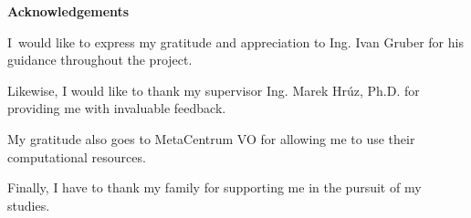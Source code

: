\vspace*{20pt}
\noindent
{\LARGE
\textbf{Acknowledgements}
}
\vspace*{0.5em}

I would like to express my gratitude and appreciation to Ing. Ivan Gruber for his guidance throughout the project.

Likewise, I would like to thank my supervisor Ing. Marek Hrúz, Ph.D. for providing me with invaluable feedback.

My gratitude also goes to MetaCentrum VO for allowing  me to use their computational resources.

Finally, I have to thank my family for supporting me in the pursuit of my studies.
